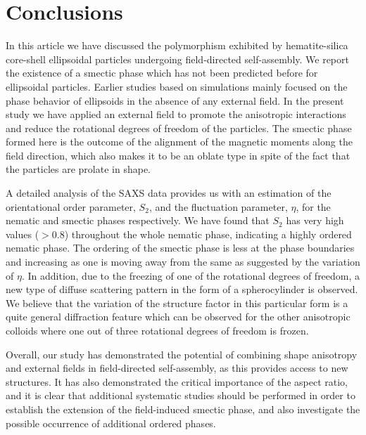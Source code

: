 \documentclass[aps,prl,preprint,superscriptaddress]{revtex4-1} %
\begin{document}
\section*{Conclusions}
In this article we have discussed the polymorphism exhibited by hematite-silica core-shell ellipsoidal particles undergoing field-directed self-assembly. We report the existence of a smectic phase which has not been predicted before for ellipsoidal particles. Earlier studies based on simulations mainly focused on the phase behavior of ellipsoids in the absence of any external field. In the present study we have applied an external field to promote the anisotropic interactions and reduce the rotational degrees of freedom of the particles. The smectic phase formed here is the outcome of the alignment of the magnetic moments along the field direction, which also makes it to be an oblate type in spite of the fact that the particles are prolate in shape.\par
A detailed analysis of the SAXS data provides us with an estimation of the orientational order parameter, $S_2$, and the fluctuation parameter, $\eta$, for the nematic and smectic phases respectively. We have found that $S_2$ has very high values ($>0.8$) throughout the whole nematic phase, indicating a highly ordered nematic phase. The ordering of the smectic phase is less at the phase boundaries and increasing as one is moving away from the same as suggested by the variation of $\eta$. In addition, due to the freezing of one of the rotational degrees of freedom, a new type of diffuse scattering pattern in the form of a spherocylinder is observed. We believe that the variation of the structure factor in this particular form is a quite general diffraction feature which can be observed for the other anisotropic colloids where one out of three rotational degrees of freedom is frozen.\par 
Overall, our study has demonstrated the potential of combining shape anisotropy and external fields in field-directed self-assembly, as this provides access to new structures. It has also demonstrated the critical importance of the aspect ratio, and it is clear that additional systematic studies should be performed in order to establish the extension of the field-induced smectic phase, and also investigate the possible occurrence of additional ordered phases.\par
\end{document}
